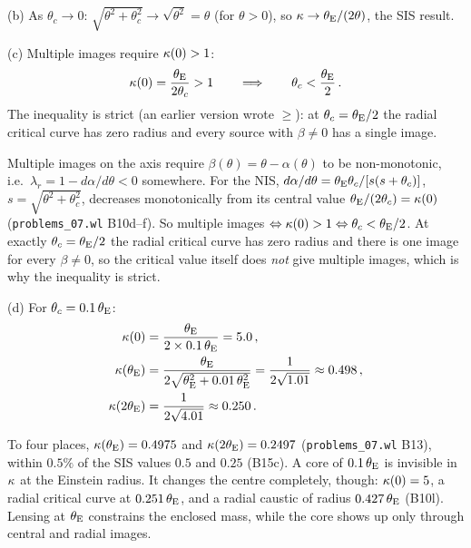 (b) As $\theta_c \to 0$:
$\sqrt{\theta^2 + \theta_c^2} \to \sqrt{\theta^2} = \theta$ (for
$\theta > 0$), so $\kappa \to \theta_{\mathrm{E}}/(2\theta)$, the SIS result.
\checkmark

(c) Multiple images require $\kappa(0) > 1$:
\begin{equation*}
    \kappa(0) = \frac{\theta_{\mathrm{E}}}{2\theta_c} > 1
    \qquad \Longrightarrow \qquad
    \theta_c < \frac{\theta_{\mathrm{E}}}{2} \,.
\end{equation*}
The inequality is strict (an earlier version wrote $\geq$): at
$\theta_c = \theta_{\mathrm{E}}/2$ the radial critical curve has zero radius and every
source with $\beta\neq0$ has a single image.

\begin{derivation}
Multiple images on the axis require $\beta(\theta) = \theta-\alpha(\theta)$ to be
non-monotonic, i.e.\ $\lambda_r = 1-d\alpha/d\theta<0$ somewhere.  For the NIS,
$d\alpha/d\theta = \theta_{\mathrm{E}}\theta_c/[s(s+\theta_c)]$, $s = \sqrt{\theta^2+\theta_c^2}$,
decreases monotonically from its central value $\theta_{\mathrm{E}}/(2\theta_c) = \kappa(0)$
(\texttt{problems\_07.wl} B10d--f).  So multiple images
$\Leftrightarrow\kappa(0)>1\Leftrightarrow\theta_c<\theta_{\mathrm{E}}/2$.  At exactly
$\theta_c = \theta_{\mathrm{E}}/2$ the radial critical curve has zero radius and there is
one image for every $\beta\neq0$, so the critical value itself does
\emph{not} give multiple images, which is why the inequality is strict.
\end{derivation}

(d) For $\theta_c = 0.1\,\theta_{\mathrm{E}}$:
\begin{align*}
    \kappa(0) &= \frac{\theta_{\mathrm{E}}}{2 \times 0.1\,\theta_{\mathrm{E}}} = 5.0 \,, \\
    \kappa(\theta_{\mathrm{E}}) &= \frac{\theta_{\mathrm{E}}}{2\sqrt{\theta_{\mathrm{E}}^2 + 0.01\,\theta_{\mathrm{E}}^2}}
    = \frac{1}{2\sqrt{1.01}} \approx 0.498 \,, \\
    \kappa(2\theta_{\mathrm{E}}) &= \frac{1}{2\sqrt{4.01}} \approx 0.250 \,.
\end{align*}

\begin{annotation}
To four places, $\kappa(\theta_{\mathrm{E}}) = 0.4975$ and $\kappa(2\theta_{\mathrm{E}}) = 0.2497$
(\texttt{problems\_07.wl} B13), within $0.5\%$ of the SIS values
$0.5$ and $0.25$ (B15c).  A core of $0.1\,\theta_{\mathrm{E}}$ is invisible in $\kappa$ at the
Einstein radius.  It changes the centre completely, though: $\kappa(0) = 5$, a
radial critical curve at $0.251\,\theta_{\mathrm{E}}$, and a radial caustic of radius
$0.427\,\theta_{\mathrm{E}}$ (B10l).  Lensing at $\theta_{\mathrm{E}}$ constrains the enclosed mass, while
the core shows up only through central and radial images.
\end{annotation}

